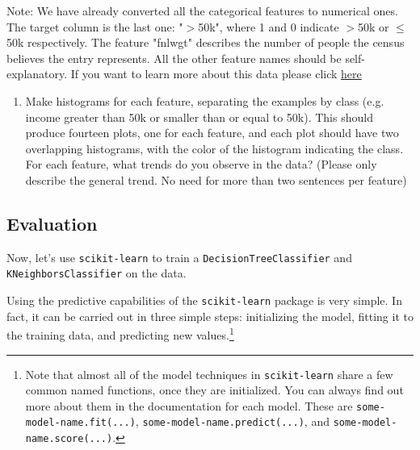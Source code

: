 Note: We have already converted all the categorical features to numerical ones. The target column is the last one: "$>$50k", where 1 and 0 indicate $>$50k or $\le$ 50k respectively. The feature "fnlwgt" describes the number of people the census believes the entry represents. All the other feature names should be self-explanatory. If you want to learn more about this data please click  \href{https://archive.ics.uci.edu/ml/datasets/adult}{here}

\begin{enumerate}
\item {} Make histograms for each feature, separating the examples by class (e.g. income greater than 50k or smaller than or equal to 50k). This should produce fourteen plots, one for each feature, and each plot should have two overlapping histograms, with the color of the histogram indicating the class. For each feature, what trends do you observe in the data? (Please only describe the general trend. No need for more than two sentences per feature) 

\solution{}

\end{enumerate}

\ifsolution{\newpage}
\subsection{Evaluation }

Now, let's use \verb|scikit-learn| to train a \verb|DecisionTreeClassifier| and \verb|KNeighborsClassifier| on the data.

Using the predictive capabilities of the \verb|scikit-learn| package is very simple. In fact, it can be carried out in three simple steps: initializing the model, fitting it to the training data, and predicting new values.\footnote{Note that almost all of the model techniques in \verb|scikit-learn| share a few common named functions, once they are initialized. You can always find out more about them in the documentation for each model. These are \verb|some-model-name.fit(...)|, \verb|some-model-name.predict(...)|, and \verb|some-model-name.score(...)|.}


